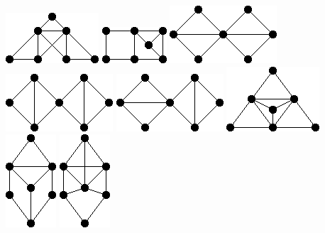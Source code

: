 \documentclass[11pt,paper=b5,footinclude,headinclude]{scrbook} %
\theoremstyle{remark}
\theoremstyle{definition} %
\theoremstyle{theorem} %
\begin{document}
\includegraphics[scale=0.5,frame]{smallGraphs/g_X1.png}     
\includegraphics[scale=0.5,frame]{smallGraphs/g_X10.png}     
\includegraphics[scale=0.5,frame]{smallGraphs/g_X100.png}     
\includegraphics[scale=0.5,frame]{smallGraphs/g_X101.png}     
\includegraphics[scale=0.5,frame]{smallGraphs/g_X102.png}     
\includegraphics[scale=0.5,frame]{smallGraphs/g_X103.png}     
\includegraphics[scale=0.5,frame]{smallGraphs/g_X104.png}     
\includegraphics[scale=0.5,frame]{smallGraphs/g_X105.png}     
\end{document}
